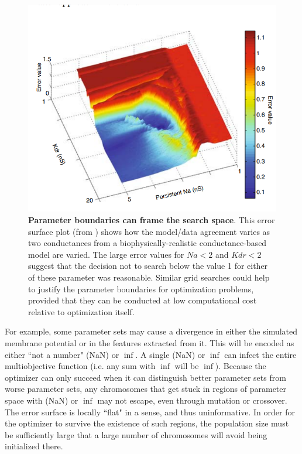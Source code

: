 \begin{figure}
    \centering
    \includegraphics[scale=0.65]{figures/cliff.png}
    \caption[A plot of a cliff ledge framing a 2D error surface]{\textbf{Parameter boundaries can frame the search space}.
This error surface plot (from \cite{van2007neurofitter,van2008automated})
shows how the model/data agreement varies as two conductances from a biophysically-realistic conductance-based model are varied.
The large error values for $Na<2$ and $Kdr<2$ suggest that the decision not to search below the value 1 for either of these parameter was reasonable.
Similar grid searches could help to justify the parameter boundaries for optimization problems, provided that they can be conducted at low computational cost relative to optimization itself.}
    \label{fig:best_at_edge}
\end{figure}

For example, some parameter sets may cause a divergence in either the simulated membrane potential or in the features extracted from it.
This will be encoded as either ``not a number" (NaN) or $\inf$.
A single (NaN) or $\inf$ can infect the entire multiobjective function (i.e. any sum with $\inf$ will be $\inf$).
Because the optimizer can only succeed when it can distinguish better parameter sets from worse parameter sets, any chromosomes that get stuck in regions of parameter space with (NaN) or $\inf$ may not escape, even through mutation or crossover.
The error surface is locally ``flat" in a sense, and thus uninformative.
In order for the optimizer to survive the existence of such regions, the population size must be sufficiently large that a large number of chromosomes will avoid being initialized there.

